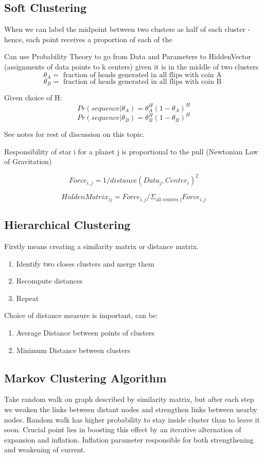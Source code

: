 \documentclass{article}
\newenvironment{example}{\par\color{brown}}{\par}
\begin{document}
\subsection{Soft Clustering}
When we can label the midpoint between two clusters as half of each cluster - hence, each point receives a proportion of each of the 

Can use Probability Theory to go from Data and Parameters to HiddenVector (assignments of data points to k centers) given it is in the middle of two clusters
$$\theta_{A} = \text{ fraction of heads generated in all flips with coin A }$$
$$\theta_{B} = \text{ fraction of heads generated in all flips with coin B } $$

Given choice of H:
$$Pr(sequence | \theta_{A}) = \theta_{A}^{H}(1-\theta_{A})^{H}$$
$$Pr(sequence | \theta_{B}) = \theta_{B}^{H}(1-\theta_{B})^{H}$$

See notes for rest of discussion on this topic.

\begin{example}
Responsibility of star i for a planet j is proportional to the pull (Newtonian Law of Gravitation)

$$Force_{i, j} = 1/distance (Data_{j}, Center_{i})^{2}$$

$$HiddenMatrix_{ij} = Force_{i, j} / \Sigma_{\text{all centers j}} Force_{i, j} $$
\end{example}


\subsection{Hierarchical Clustering}
Firstly means creating a similarity matrix or distance matrix.

\begin{enumerate}
    \item Identify two closes clusters and merge them
    \item Recompute distances
    \item Repeat
\end{enumerate}

Choice of distance measure is important, can be:
\begin{enumerate}
    \item Average Distance between points of clusters
    \item Minimum Distance between clusters
\end{enumerate}

\subsection{Markov Clustering Algorithm}
Take random walk on graph described by similarity matrix, but after each step we weaken the links between distant nodes and strengthen links between nearby nodes. Random walk has higher probability to stay inside cluster than to leave it soon. Crucial point lies in boosting this effect by an iterative alternation of expansion and inflation. Inflation parameter responsible for both strengthening and weakening of current.
\end{document}
